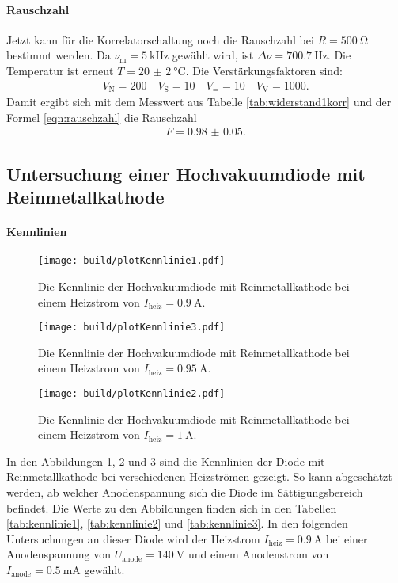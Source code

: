 \paragraph{Rauschzahl}

Jetzt kann für die Korrelatorschaltung noch die Rauschzahl bei $R = \SI{500}{\ohm}$ bestimmt werden. Da $\nu_\text{m} = \SI{5}{\kilo\hertz}$ gewählt wird, ist $\Delta \nu = \SI{700.7}{\hertz}$. Die Temperatur ist erneut $T = \SI{20(2)}{\celsius}$. Die Verstärkungsfaktoren sind:
\begin{align*}
  V_\text{N} = 200 \quad V_\text{S} = 10 \quad V_= = 10 \quad V_\text{V} = 1000.
\end{align*}
Damit ergibt sich mit dem Messwert aus Tabelle \ref{tab:widerstand1korr} und der Formel \eqref{eqn:rauschzahl} die Rauschzahl
\begin{align}
  F = \num{0.98(5)}.
\end{align}

\subsection{Untersuchung einer Hochvakuumdiode mit Reinmetallkathode}

\paragraph{Kennlinien}
\begin{figure}
  \centering
  \texttt{[image: build/plotKennlinie1.pdf]}
  \caption{Die Kennlinie der Hochvakuumdiode mit Reinmetallkathode bei einem Heizstrom von $I_\text{heiz} = \SI{0.9}{\ampere}$.}
  \label{fig:plotKennlinie1}
\end{figure}
\begin{figure}
  \centering
  \texttt{[image: build/plotKennlinie3.pdf]}
  \caption{Die Kennlinie der Hochvakuumdiode mit Reinmetallkathode bei einem Heizstrom von $I_\text{heiz} = \SI{0.95}{\ampere}$.}
  \label{fig:plotKennlinie3}
\end{figure}
\begin{figure}
  \centering
  \texttt{[image: build/plotKennlinie2.pdf]}
  \caption{Die Kennlinie der Hochvakuumdiode mit Reinmetallkathode bei einem Heizstrom von $I_\text{heiz} = \SI{1}{\ampere}$.}
  \label{fig:plotKennlinie2}
\end{figure}
In den Abbildungen \ref{fig:plotKennlinie1}, \ref{fig:plotKennlinie3} und \ref{fig:plotKennlinie2} sind die Kennlinien der Diode mit Reinmetallkathode bei verschiedenen Heizströmen gezeigt. So kann abgeschätzt werden, ab welcher Anodenspannung sich die Diode im Sättigungsbereich befindet.
Die Werte zu den Abbildungen finden sich in den Tabellen \ref{tab:kennlinie1}, \ref{tab:kennlinie2} und \ref{tab:kennlinie3}.
In den folgenden Untersuchungen an dieser Diode wird der Heizstrom $I_\text{heiz} = \SI{0.9}{\ampere}$ bei einer Anodenspannung von $U_\text{anode} = \SI{140}{\volt}$
und einem Anodenstrom von $I_\text{anode} = \SI{0.5}{\milli\ampere}$ gewählt.

